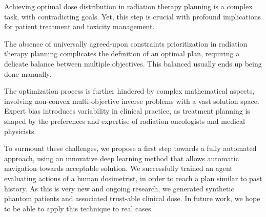Achieving optimal dose distribution in radiation therapy planning is a complex task, with contradicting goals.
Yet, this step is crucial with profound implications for patient treatment and toxicity management.

The absence of universally agreed-upon constraints prioritization in radiation therapy planning complicates the definition of an optimal plan, requiring a delicate balance between multiple objectives.
This balanced usually ends up being done manually.

The optimization process is further hindered by complex mathematical aspects, involving non-convex multi-objective inverse problems with a vast solution space.
Expert bias introduces variability in clinical practice, as treatment planning is shaped by the preferences and expertise of radiation oncologists and medical physicists.

To surmount these challenges, we propose a first step towards a fully automated approach, using an innovative deep learning method that allows automatic navigation towards acceptable solution.
We successfully trained an agent evaluating actions of a human dosimetrist, in order to reach a plan similar to past history.
As this is very new and ongoing research, we generated synthetic phantom patients and associated trust-able clinical dose.
In future work, we hope to be able to apply this technique to real cases.